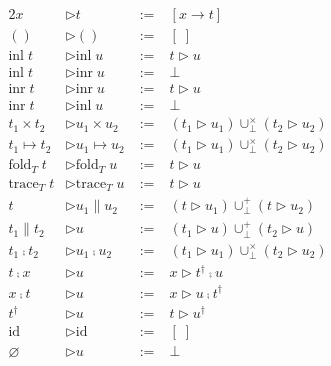 \documentclass{jsarticle}
\begin{document}
\begin{figure}[H]
  \begin{minipage}[b]{0.48\hsize}
    \begin{alignat*}{2}
      x                 &\triangleright t                 \;&:=\; &[x \rightarrow t] \\
      ()                &\triangleright ()                \;&:=\; &[\;] \\
      \text{inl}\;t     &\triangleright \text{inl}\;u     \;&:=\; &t \triangleright u \\
      \text{inl}\;t     &\triangleright \text{inr}\;u     \;&:=\; &\bot \\
      \text{inr}\;t     &\triangleright \text{inr}\;u     \;&:=\; &t \triangleright u \\
      \text{inr}\;t     &\triangleright \text{inl}\;u     \;&:=\; &\bot \\
      t_1\times{}t_2    &\triangleright u_1\times{}u_2    \;&:=\; &(t_1 \triangleright u_1)\cup^\times_\bot(t_2 \triangleright u_2) \\
      t_1\mapsto{}t_2   &\triangleright u_1\mapsto{}u_2   \;&:=\; &(t_1 \triangleright u_1)\cup^\times_\bot(t_2 \triangleright u_2) \\
      \text{fold}_T\;t  &\triangleright \text{fold}_T\;u  \;&:=\; &t \triangleright u \\
      \text{trace}_T\;t &\triangleright \text{trace}_T\;u \;&:=\; &t \triangleright u \\
      t                 &\triangleright u_1\parallel{}u_2 \;&:=\; &(t \triangleright u_1)\cup^+_\bot(t \triangleright u_2) \\
      t_1\parallel{}t_2 &\triangleright u                 \;&:=\; &(t_1 \triangleright u)\cup^+_\bot(t_2 \triangleright u) \\
      t_1\fcmp{}t_2     &\triangleright u_1\fcmp{}u_2     \;&:=\; &(t_1 \triangleright u_1)\cup^\times_\bot(t_2 \triangleright u_2) \\
      t\fcmp{}x         &\triangleright u                 \;&:=\; &x \triangleright t^\dagger\fcmp{}u \\
      x\fcmp{}t         &\triangleright u                 \;&:=\; &x \triangleright u\fcmp{}t^\dagger \\
      t^\dagger         &\triangleright u                 \;&:=\; &t \triangleright u^\dagger \\
      \text{id}         &\triangleright \text{id}         \;&:=\; &[\;] \\
      \varnothing       &\triangleright u                 \;&:=\; &\bot \\

\end{alignat*}
\end{minipage}
\end{figure}
\end{document}
